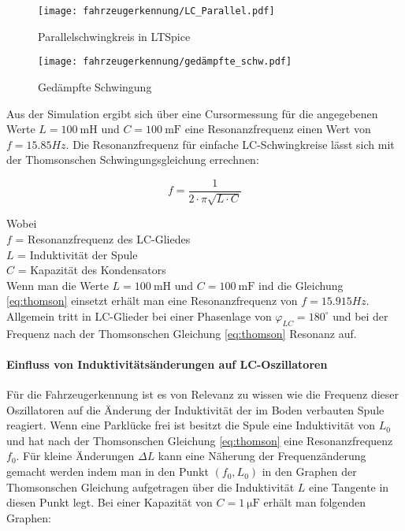 \begin{figure}[H]
    \centering
    \texttt{[image: fahrzeugerkennung/LC\_Parallel.pdf]}
    \caption{Parallelschwingkreis in LTSpice}
\end{figure}

\begin{figure}[H]
    \centering
    \texttt{[image: fahrzeugerkennung/gedämpfte\_schw.pdf]}
    \caption{Gedämpfte Schwingung}
\end{figure}

Aus der Simulation ergibt sich über eine Cursormessung für die angegebenen Werte $L = \SI{100}{\milli\henry}$ und $C = \SI{100}{\milli\farad}$ eine Resonanzfrequenz einen Wert von $f = 15.85Hz$. Die Resonanzfrequenz für einfache LC-Schwingkreise lässt sich mit der
Thomsonschen Schwingungsgleichung errechnen:

\begin{equation} \label{eq:thomson}
    f = \frac{1}{2 \cdot \pi \sqrt{L \cdot C}}
\end{equation}

Wobei \\
$f$ = Resonanzfrequenz des LC-Gliedes\\
$L$ = Induktivität der Spule\\
$C$ = Kapazität des Kondensators\\

Wenn man die Werte $L = \SI{100}{\milli\henry}$ und $C = \SI{100}{\milli\farad}$ ind die Gleichung \ref{eq:thomson} einsetzt erhält man eine Resonanzfrequenz von $f = 15.915Hz$.
Allgemein tritt in LC-Glieder bei einer Phasenlage von $\varphi_{LC} = 180^{\circ}$ und bei der Frequenz nach der Thomsonschen Gleichung \ref{eq:thomson}  Resonanz auf. 

\paragraph{Einfluss von Induktivitätsänderungen auf LC-Oszillatoren}\mbox{}

Für die Fahrzeugerkennung ist es von Relevanz zu wissen wie die Frequenz dieser Oszillatoren auf die Änderung der Induktivität der im Boden verbauten Spule reagiert.
Wenn eine Parklücke frei ist besitzt die Spule eine Induktivität von $L_{0}$ und hat nach der Thomsonschen Gleichung \ref{eq:thomson} eine Resonanzfrequenz $f_{0}$. Für kleine Änderungen $\Delta L$ kann eine Näherung
der Frequenzänderung gemacht werden indem man in den Punkt $(f_{0}, L_{0})$ in den Graphen der Thomsonschen Gleichung aufgetragen über die Induktivität $L$ eine Tangente in diesen Punkt legt. Bei einer 
Kapazität von $C = \SI{1}{\micro\farad}$ erhält man folgenden Graphen: 

